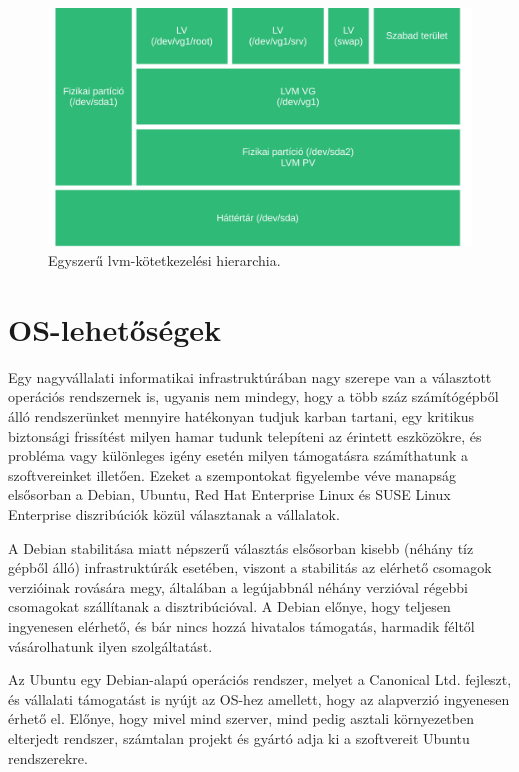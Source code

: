 \begin{figure}[!ht]
	\centering
	\includegraphics[width=14cm]{figures/lvm.pdf}
	\caption{Egyszerű \acrshort{lvm}-kötetkezelési hierarchia.}
	\label{fig:lvm}
\end{figure}

\section{OS-lehetőségek} \label{sect:os}
Egy nagyvállalati informatikai infrastruktúrában nagy szerepe van a választott operációs rendszernek is, ugyanis nem mindegy, hogy a több száz számítógépből álló rendszerünket mennyire hatékonyan tudjuk karban tartani, egy kritikus biztonsági frissítést milyen hamar tudunk telepíteni az érintett eszközökre, és probléma vagy különleges igény esetén milyen támogatásra számíthatunk a szoftvereinket illetően.
Ezeket a szempontokat figyelembe véve manapság elsősorban a Debian, Ubuntu, Red Hat Enterprise Linux és SUSE Linux Enterprise diszribúciók közül választanak a vállalatok.

A Debian stabilitása miatt népszerű választás elsősorban kisebb (néhány tíz gépből álló) infrastruktúrák esetében, viszont a stabilitás az elérhető csomagok verzióinak rovására megy, általában a legújabbnál néhány verzióval régebbi csomagokat szállítanak a disztribúcióval. A Debian előnye, hogy teljesen ingyenesen elérhető, és bár nincs hozzá hivatalos támogatás, harmadik féltől vásárolhatunk ilyen szolgáltatást.

Az Ubuntu egy Debian-alapú operációs rendszer, melyet a Canonical Ltd. fejleszt, és vállalati támogatást is nyújt az OS-hez amellett, hogy az alapverzió ingyenesen érhető el. Előnye, hogy mivel mind szerver, mind pedig asztali környezetben elterjedt rendszer, számtalan projekt és gyártó adja ki a szoftvereit Ubuntu rendszerekre.

